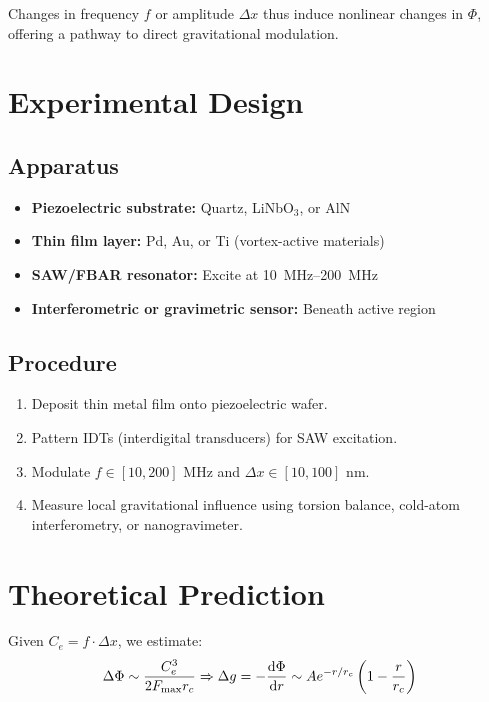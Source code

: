     Changes in frequency \( f \) or amplitude \( \Delta x \) thus induce nonlinear changes in \( \Phi \), offering a pathway to direct gravitational modulation.

    \section*{Experimental Design}
    \subsection*{Apparatus}
    \begin{itemize}
        \item \textbf{Piezoelectric substrate:} Quartz, LiNbO$_3$, or AlN
        \item \textbf{Thin film layer:} Pd, Au, or Ti (vortex-active materials)
        \item \textbf{SAW/FBAR resonator:} Excite at \SI{10}{MHz}--\SI{200}{MHz}
        \item \textbf{Interferometric or gravimetric sensor:} Beneath active region
    \end{itemize}

    \subsection*{Procedure}
    \begin{enumerate}
        \item Deposit thin metal film onto piezoelectric wafer.
        \item Pattern IDTs (interdigital transducers) for SAW excitation.
        \item Modulate \( f \in [10, 200] \) MHz and \( \Delta x \in [10, 100] \) nm.
        \item Measure local gravitational influence using torsion balance, cold-atom interferometry, or nanogravimeter.
    \end{enumerate}

    \section*{Theoretical Prediction}
    Given \( C_e = f \cdot \Delta x \), we estimate:
    \begin{equation}
        \Delta \Phi \sim \frac{C_e^3}{2 F_{\text{max}} r_c} \Rightarrow \Delta g = -\dv{\Phi}{r} \sim A e^{-r/r_c} \left(1 - \frac{r}{r_c}\right)
    \end{equation}

